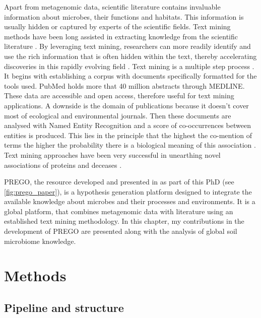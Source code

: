 Apart from metagenomic data, scientific literature contains invaluable information
about microbes, their functions and habitats. This information is usually hidden 
or captured by experts of the scientific fields. 
Text mining methods have been long assisted in extracting knowledge from 
the scientific literature \parencite{jensen2006Literature}. 
By leveraging text mining, researchers can more readily identify and use the rich information that
is often hidden within the text, thereby accelerating discoveries in this
rapidly evolving field \parencite{badal2019Challenges}. Text mining is a multiple step
process \parencite{10.5555/1199003}. It begins with establishing a corpus with 
documents specifically formatted for the tools used. PubMed \parencite{roberts2001pubmed}
holds more that 40 million abstracts through MEDLINE. These data are accessible 
and open access, therefore useful for text mining applications. A downside is the 
domain of publications because it doesn't cover most of ecological and environmental 
journals. Then these documents are analysed with Named Entity Recognition and a 
score of co-occurrences between entities is produced. This lies in the principle 
that the highest the co-mention of terms the higher the probability there is 
a biological meaning of this association \parencite{jensen2006Literature}.
Text mining approaches have been very successful in unearthing novel 
associations of proteins and deceases \parencite{pletscher2015diseases}.

PREGO, the resource developed and presented in \textcite{microorganisms10020293}
as part of this PhD (see \ref{fig:prego_paper}), is a hypothesis generation platform designed to integrate the 
available knowledge about microbes and their processes and environments. 
It is a global platform, that combines metagenomic data with literature
using an established text mining methodology. 
In this chapter, my contributions in the development of PREGO are presented along with the analysis of global 
soil microbiome knowledge.

\section{Methods}
\label{sec:prego-methods}

   \subsection{Pipeline and structure}
   \label{subsec:prego-pipeline}

